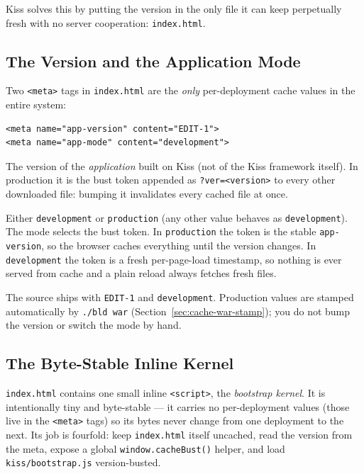 Kiss solves this by putting the version in the only file it can keep perpetually fresh with no server cooperation: \texttt{index.html}.

\subsection{The Version and the Application Mode}
\label{sec:cache-version-meta}

Two \texttt{<meta>} tags in \texttt{index.html} are the \emph{only} per-deployment cache values in the entire system:

\begin{lstlisting}[style=html]
<meta name="app-version" content="EDIT-1">
<meta name="app-mode" content="development">
\end{lstlisting}

\begin{description}[style=nextline]
  \item[\texttt{app-version}] The version of the \emph{application} built on Kiss (not of the Kiss framework itself).  In production it is the bust token appended as \texttt{?ver=<version>} to every other downloaded file: bumping it invalidates every cached file at once.
  \item[\texttt{app-mode}] Either \texttt{development} or \texttt{production} (any other value behaves as \texttt{development}).  The mode selects the bust token.  In \texttt{production} the token is the stable \texttt{app-version}, so the browser caches everything until the version changes.  In \texttt{development} the token is a fresh per-page-load timestamp, so nothing is ever served from cache and a plain reload always fetches fresh files.
\end{description}

\noindent
The source ships with \texttt{EDIT-1} and \texttt{development}.  Production values are stamped automatically by \texttt{./bld war} (Section~\ref{sec:cache-war-stamp}); you do not bump the version or switch the mode by hand.

\subsection{The Byte-Stable Inline Kernel}
\label{sec:cache-kernel}

\texttt{index.html} contains one small inline \texttt{<script>}, the \emph{bootstrap kernel}.  It is intentionally tiny and byte-stable --- it carries no per-deployment values (those live in the \texttt{<meta>} tags) so its bytes never change from one deployment to the next.  Its job is fourfold: keep \texttt{index.html} itself uncached, read the version from the meta, expose a global \texttt{window.cacheBust()} helper, and load \texttt{kiss/bootstrap.js} version-busted.

